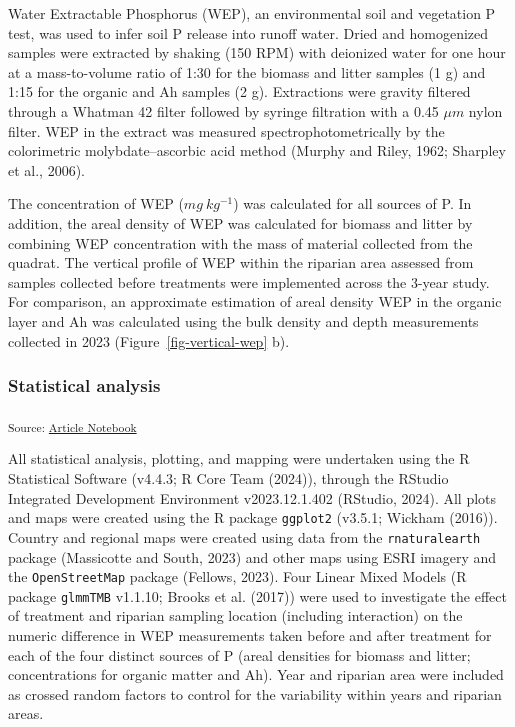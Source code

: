 \documentclass[
]{agujournal2019}
\begin{document}
Water Extractable Phosphorus (WEP), an environmental soil and vegetation
P test, was used to infer soil P release into runoff water. Dried and
homogenized samples were extracted by shaking (150 RPM) with deionized
water for one hour at a mass-to-volume ratio of 1:30 for the biomass and
litter samples (1 g) and 1:15 for the organic and Ah samples (2 g).
Extractions were gravity filtered through a Whatman 42 filter followed
by syringe filtration with a 0.45 \(\mu m\) nylon filter. WEP in the
extract was measured spectrophotometrically by the colorimetric
molybdate--ascorbic acid method (Murphy and Riley, 1962; Sharpley et
al., 2006).

The concentration of WEP (\(mg~kg^{-1}\)) was calculated for all sources
of P. In addition, the areal density of WEP was calculated for biomass
and litter by combining WEP concentration with the mass of material
collected from the quadrat. The vertical profile of WEP within the
riparian area assessed from samples collected before treatments were
implemented across the 3-year study. For comparison, an approximate
estimation of areal density WEP in the organic layer and Ah was
calculated using the bulk density and depth measurements collected in
2023 (Figure~\ref{fig-vertical-wep} b).

\subsubsection{Statistical analysis}\label{statistical-analysis}

\textsubscript{Source:
\href{https://alex-koiter.github.io/riparian-grazing-manuscript/index.qmd.html}{Article
Notebook}}

All statistical analysis, plotting, and mapping were undertaken using
the R Statistical Software (v4.4.3; R Core Team (2024)), through the
RStudio Integrated Development Environment v2023.12.1.402 (RStudio,
2024). All plots and maps were created using the R package
\texttt{ggplot2} (v3.5.1; Wickham (2016)). Country and regional maps
were created using data from the \texttt{rnaturalearth} package
(Massicotte and South, 2023) and other maps using ESRI imagery and the
\texttt{OpenStreetMap} package (Fellows, 2023). Four Linear Mixed Models
(R package \texttt{glmmTMB} v1.1.10; Brooks et al. (2017)) were used to
investigate the effect of treatment and riparian sampling location
(including interaction) on the numeric difference in WEP measurements
taken before and after treatment for each of the four distinct sources
of P (areal densities for biomass and litter; concentrations for organic
matter and Ah). Year and riparian area were included as crossed random
factors to control for the variability within years and riparian areas.
\end{document}

